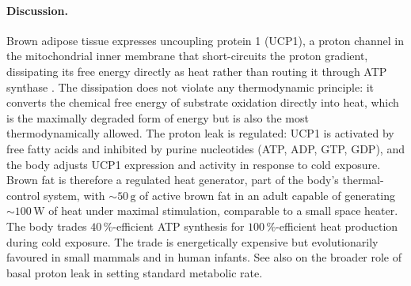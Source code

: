 \paragraph{Discussion.}
Brown adipose tissue expresses uncoupling protein 1 (UCP1), a proton
channel in the mitochondrial inner membrane that short-circuits the
proton gradient, dissipating its free energy directly as heat rather
than routing it through ATP synthase
\cite{paper:v6c02-cannon-brown-fat-2004}. The dissipation does not
violate any thermodynamic principle: it converts the chemical free
energy of substrate oxidation directly into heat, which is the
maximally degraded form of energy but is also the most thermodynamically
allowed. The proton leak is regulated: UCP1 is activated by free
fatty acids and inhibited by purine nucleotides (ATP, ADP, GTP, GDP),
and the body adjusts UCP1 expression and activity in response to cold
exposure. Brown fat is therefore a regulated heat generator, part of
the body's thermal-control system, with $\sim 50\,\text{g}$ of active
brown fat in an adult capable of generating $\sim 100\,\text{W}$ of
heat under maximal stimulation, comparable to a small space heater.
The body trades $40\,\%$-efficient ATP synthesis for $100\,\%$-efficient
heat production during cold exposure. The trade is energetically
expensive but evolutionarily favoured in small mammals and in human
infants. See also \cite{paper:v6c02-jastroch-uncoupling-2010} on the
broader role of basal proton leak in setting standard metabolic rate.
